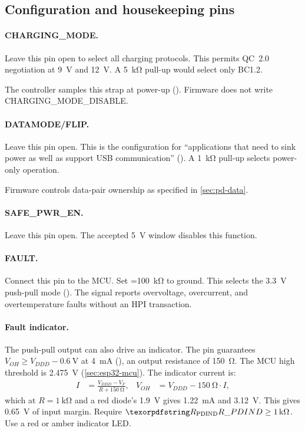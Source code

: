 \subsection{Configuration and housekeeping pins}\label{sec:pd-pins}

\paragraph{CHARGING\_MODE.} Leave this pin open to select all charging
protocols. This permits QC~2.0 negotiation at \SI{9}{\volt} and
\SI{12}{\volt}. A \SI{5}{\kilo\ohm} pull-up would select only BC1.2.

The controller samples this strap at power-up
(). Firmware does not write
CHARGING\_\allowbreak MODE\_\allowbreak DISABLE.

\paragraph{DATAMODE/FLIP.} Leave this pin open. This is the configuration for
``applications that need to sink power as well as support USB communication''
(). A
\SI{1}{\kilo\ohm} pull-up selects power-only operation.

Firmware controls data-pair ownership as specified in \cref{sec:pd-data}.

\paragraph{SAFE\_PWR\_EN.} Leave this pin open. The accepted \SI{5}{\volt}
window disables this function.

\paragraph{FAULT.} Connect this pin to the MCU. Set
=\SI{100}{\kilo\ohm} to ground. This selects the
\SI{3.3}{\volt} push-pull mode
(). The signal reports
overvoltage, overcurrent, and overtemperature faults without an HPI
transaction.

\paragraph{Fault indicator.} The push-pull output can also drive an indicator.
The pin guarantees
$V_{OH} \geq V_{DDD} - \SI{0.6}{\volt}$ at \SI{4}{\milli\ampere}
(), an output resistance of
\SI{150}{\ohm}. The MCU high threshold is \SI{2.475}{\volt}
(\cref{sec:esp32-mcu}). The indicator current is:
\begin{align*}
  I &= \frac{V_{DDD} - V_F}{R + \SI{150}{\ohm}}, &
  V_{OH} &= V_{DDD} - \SI{150}{\ohm}\cdot I,
\end{align*}
which at $R = \SI{1}{\kilo\ohm}$ and a red diode's \SI{1.9}{\volt} gives
\SI{1.22}{\milli\ampere} and \SI{3.12}{\volt}. This gives
\SI{0.65}{\volt} of input margin. Require $\des{R}{PDIND}\geq
\SI{1}{\kilo\ohm}$. Use a red or amber indicator LED.

